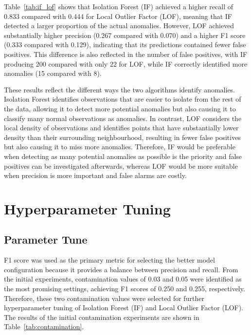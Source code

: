 \documentclass[a4paper,12pt]{article}
\begin{document}
Table~\ref{tab:if_lof} shows that Isolation Forest (IF) achieved a higher recall of 0.833 compared with 0.444 for Local Outlier Factor (LOF), meaning that IF detected a larger proportion of the actual anomalies. However, LOF achieved substantially higher precision (0.267 compared with 0.070) and a higher F1 score (0.333 compared with 0.129), indicating that its predictions contained fewer false positives. This difference is also reflected in the number of false positives, with IF producing 200 compared with only 22 for LOF, while IF correctly identified more anomalies (15 compared with 8).

These results reflect the different ways the two algorithms identify anomalies. Isolation Forest identifies observations that are easier to isolate from the rest of the data, allowing it to detect more potential anomalies but also causing it to classify many normal observations as anomalies. In contrast, LOF considers the local density of observations and identifies points that have substantially lower density than their surrounding neighbourhood, resulting in fewer false positives but also causing it to miss more anomalies. Therefore, IF would be preferable when detecting as many potential anomalies as possible is the priority and false positives can be investigated afterwards, whereas LOF would be more suitable when precision is more important and false alarms are costly.

\section{Hyperparameter Tuning}
\subsection{Parameter Tune}

F1 score was used as the primary metric for selecting the better model configuration because it provides a balance between precision and recall. From the initial experiments, contamination values of 0.03 and 0.05 were identified as the most promising settings, achieving F1 scores of 0.250 and 0.255, respectively. Therefore, these two contamination values were selected for further hyperparameter tuning of Isolation Forest (IF) and Local Outlier Factor (LOF). The results of the initial contamination experiments are shown in Table~\ref{tab:contamination}.
\end{document}
